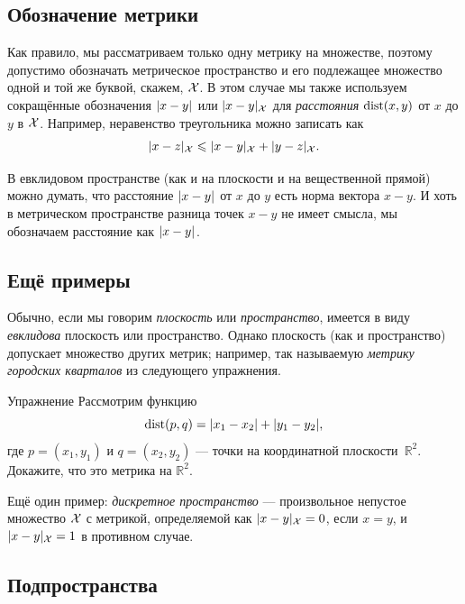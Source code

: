{{}

\subsection*{Обозначение метрики}

Как правило, мы рассматриваем только одну метрику на множестве, поэтому допустимо обозначать метрическое пространство и его подлежащее множество одной и той же буквой, скажем, $\mathcal{X}$.
В этом случае мы также используем сокращённые обозначения $\dist{x}{y}{}$ или $\dist{x}{y}{\spc{X}}$ для \emph{расстояния} $\mathop{\rm dist}\nolimits(x,y)$ от $x$ до $y$ в $\mathcal{X}$.
Например, неравенство треугольника можно записать как
$$\dist{x}{z}{\spc{X}}\le \dist{x}{y}{\spc{X}}+\dist{y}{z}{\spc{X}}.$$

В евклидовом пространстве (как и на плоскости и на вещественной прямой) можно думать, что расстояние $\dist{x}{y}{}$ от $x$ до $y$ есть норма вектора $x-y$.
И хоть в метрическом пространстве разница точек $x-y$ не имеет смысла, мы  обозначаем расстояние как $\dist{x}{y}{}$.

\subsection*{Ещё примеры}

Обычно, если мы говорим \emph{плоскость} или \emph{пространство}, имеется в виду \emph{евклидова} плоскость или пространство.
Однако плоскость (как и пространство) допускает множество других метрик; например, так называемую \emph{метрику городских кварталов} из следующего упражнения.

\begin{thm}{Упражнение}\label{ex:ell-infty}
Рассмотрим функцию
$$\mathop{\rm dist}\nolimits(p,q)=|x_1-x_2|+|y_1-y_2|,$$
где $p=(x_1,y_1)$ и $q=(x_2,y_2)$ --- точки на координатной плоскости~$\mathbb{R}^2$.
Докажите, что это метрика на $\mathbb{R}^2$.
\end{thm}

Ещё один пример: \emph{дискретное пространство} --- произвольное непустое множество $\mathcal{X}$ с метрикой, определяемой как $\dist{x}{y}{\spc{X}}=0$, если $x=y$, и $\dist{x}{y}{\spc{X}}=1$ в противном случае.

\subsection*{Подпространства}

{\sloppy

}}
